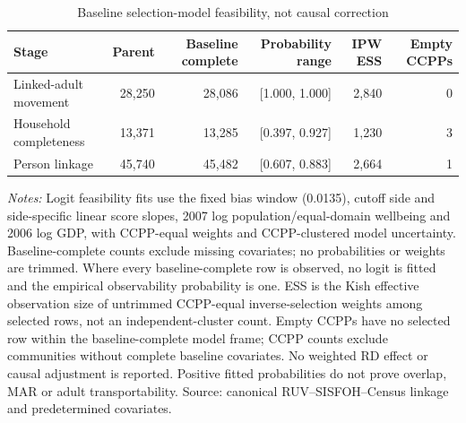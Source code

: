 \begin{table}[!htbp]\centering\small
\caption{Baseline selection-model feasibility, not causal correction}
\label{tab:rd_mechanisms_selection_feasibility}
\begin{tabular}{lrrrrr}\toprule
Stage & Parent & Baseline complete & Probability range & IPW ESS & Empty CCPPs \\
\midrule
Linked-adult movement &    28,250 &    28,086 & [1.000, 1.000] &     2,840 &   0 \\
Household completeness &    13,371 &    13,285 & [0.397, 0.927] &     1,230 &   3 \\
Person linkage &    45,740 &    45,482 & [0.607, 0.883] &     2,664 &   1 \\
\bottomrule\end{tabular}
\parbox{0.98\linewidth}{\footnotesize\textit{Notes:} Logit feasibility fits use the fixed bias window (0.0135), cutoff side and side-specific linear score slopes, 2007 log population/equal-domain wellbeing and 2006 log GDP, with CCPP-equal weights and CCPP-clustered model uncertainty. Baseline-complete counts exclude missing covariates; no probabilities or weights are trimmed. Where every baseline-complete row is observed, no logit is fitted and the empirical observability probability is one. ESS is the Kish effective observation size of untrimmed CCPP-equal inverse-selection weights among selected rows, not an independent-cluster count. Empty CCPPs have no selected row within the baseline-complete model frame; CCPP counts exclude communities without complete baseline covariates. No weighted RD effect or causal adjustment is reported. Positive fitted probabilities do not prove overlap, MAR or adult transportability. Source: canonical RUV--SISFOH--Census linkage and predetermined covariates.}
\end{table}
